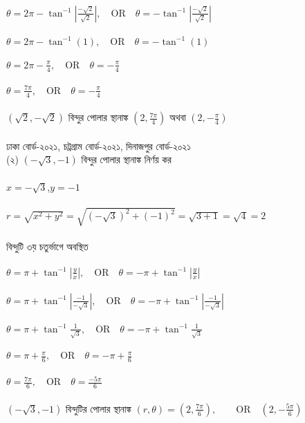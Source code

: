 \documentclass{article}
\begin{document}
	\\ 
	$\theta= 2\pi-\tan^{-1}|\frac{-\sqrt{2}}{\sqrt{2}}|,\quad \mbox{OR}\quad \theta= -\tan^{-1}|\frac{-\sqrt{2}}{\sqrt{2}}| $\\
	\\
	$\theta= 2\pi-\tan^{-1}(1),\quad \mbox{OR}\quad \theta= -\tan^{-1}(1) $\\
	\\ 
	$\theta= 2\pi-\frac{\pi}{4},\quad \mbox{OR}\quad \theta= -\frac{\pi}{4} $\\
	\\
		$\theta= \frac{7\pi}{4},\quad \mbox{OR}\quad \theta= -\frac{\pi}{4} $\\
		\\
		$(\sqrt{2},-\sqrt{2})$ বিন্দুর পোলার স্থানাঙ্ক $(2,\frac{7\pi}{4})$ অথবা  $(2,-\frac{\pi}{4})$\\
		\\ 
	ঢাকা বোর্ড-২০২১, চট্রগ্রাম বোর্ড-২০২১, দিনাজপুর বোর্ড-২০২১ \\
(২)	$(-\sqrt{3},-1)$ বিন্দুর পোলার স্থানাঙ্ক নির্ণয় কর\\
	\\
		$x=-\sqrt{3}$,\quad $y=-1$\\
	\\
	$r=\sqrt{x^2+y^2}=\sqrt{(-\sqrt{3})^2+(-1)^2}=\sqrt{3+1}=\sqrt{4}=2$\\
	\\
	বিন্দুটি ৩য় চতুর্ভাগে অবস্থিত \\
	\\
	$\theta= \pi+\tan^{-1}|\frac{y}{x}|,\quad \mbox{OR}\quad \theta= -\pi+\tan^{-1}|\frac{y}{x}| $\\
	\\
	$\theta= \pi+\tan^{-1}|\frac{-1}{-\sqrt{3}}|,\quad \mbox{OR}\quad \theta= -\pi+\tan^{-1}|\frac{-1}{-\sqrt{3}}| $\\
	\\
	$\theta= \pi+\tan^{-1}\frac{1}{\sqrt{3}},\quad \mbox{OR}\quad \theta= -\pi+\tan^{-1}\frac{1}{\sqrt{3}} $\\
	\\
	$\theta= \pi+\frac{\pi}{6},\quad \mbox{OR}\quad \theta= -\pi+\frac{\pi}{6} $\\
	\\
	$\theta=\frac{7\pi}{6},\quad \mbox{OR}\quad \theta= \frac{-5\pi}{6} $\\
	\\
$(-\sqrt{3},-1)$	বিন্দুটির পোলার স্থানাঙ্ক $(r,\theta)=(2,\frac{7\pi}{6}),\qquad \mbox{OR}\quad (2,-\frac{5\pi}{6})$\\
\end{document}
